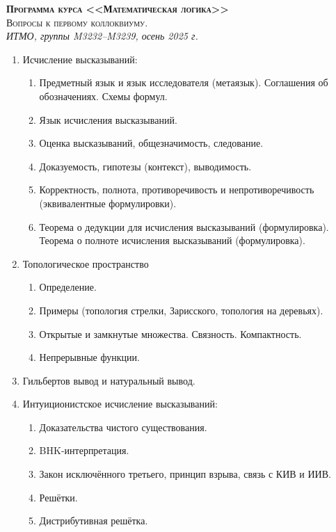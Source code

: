 \documentclass[11pt,a4paper,oneside]{scrartcl}
\begin{document}
\pagestyle{empty}

\begin{center}
{\large\scshape\bfseries Программа курса <<Математическая логика>>}\\
{\large\scshape Вопросы к первому коллоквиуму.}\\
\itshape ИТМО, группы M3232--M3239, осень 2025 г.
\end{center}


\begin{enumerate}
\item Исчисление высказываний:
\begin{enumerate}
\item Предметный язык и язык исследователя (метаязык). Соглашения об обозначениях. Схемы формул.
\item Язык исчисления высказываний.
\item Оценка высказываний, общезначимость, следование.
\item Доказуемость, гипотезы (контекст), выводимость.
\item Корректность, полнота, противоречивость и непротиворечивость (эквивалентные формулировки).
\item Теорема о дедукции для исчисления высказываний (формулировка). Теорема о полноте исчисления высказываний (формулировка).
\end{enumerate}
\item Топологическое пространство
\begin{enumerate}
\item Определение.
\item Примеры (топология стрелки, Зарисского, топология на деревьях). 
\item Открытые и замкнутые множества. Связность. Компактность. 
\item Непрерывные функции.
\end{enumerate}
\item Гильбертов вывод и натуральный вывод.
\item Интуиционистское исчисление высказываний:
\begin{enumerate}
\item Доказательства чистого существования.
\item BHK-интерпретация. 
\item Закон исключённого третьего, принцип взрыва, связь с КИВ и ИИВ.
\item Решётки. 
\item Дистрибутивная решётка.

\end{enumerate}
\end{enumerate}
\end{document}
